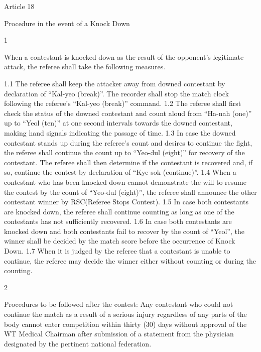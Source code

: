 \documentclass[
]{report}
\begin{document}
Article 18

Procedure in the event of a Knock Down

1

When a contestant is knocked down as the result of the opponent's
legitimate attack, the referee shall take the following measures.

1.1 The referee shall keep the attacker away from downed contestant by
declaration of ``Kal-yeo (break)''. The recorder shall stop the match
clock following the referee's ``Kal-yeo (break)'' command. 1.2 The
referee shall first check the status of the downed contestant and count
aloud from ``Ha-nah (one)'' up to ``Yeol (ten)'' at one second intervals
towards the downed contestant, making hand signals indicating the
passage of time. 1.3 In case the downed contestant stands up during the
referee's count and desires to continue the fight, the referee shall
continue the count up to ``Yeo-dul (eight)'' for recovery of the
contestant. The referee shall then determine if the contestant is
recovered and, if so, continue the contest by declaration of ``Kye-sok
(continue)''. 1.4 When a contestant who has been knocked down cannot
demonstrate the will to resume the contest by the count of ``Yeo-dul
(eight)'', the referee shall announce the other contestant winner by
RSC(Referee Stops Contest). 1.5 In case both contestants are knocked
down, the referee shall continue counting as long as one of the
contestants has not sufficiently recovered. 1.6 In case both contestants
are knocked down and both contestants fail to recover by the count of
``Yeol'', the winner shall be decided by the match score before the
occurrence of Knock Down. 1.7 When it is judged by the referee that a
contestant is unable to continue, the referee may decide the winner
either without counting or during the counting.

2

Procedures to be followed after the contest: Any contestant who could
not continue the match as a result of a serious injury regardless of any
parts of the body cannot enter competition within thirty (30) days
without approval of the WT Medical Chairman after submission of a
statement from the physician designated by the pertinent national
federation.
\end{document}
